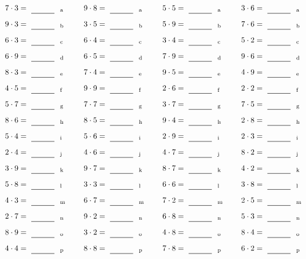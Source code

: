 \documentclass
[
  draft    = true,
  fontsize = 11pt,
  parskip  = half-
]
{scrartcl}
\begin{document}
\par\vfill\par
\begin{align*}
    \pline{7\cdot3}&=\rline{a}
  & \pline{9\cdot8}&=\rline{a}
  & \pline{5\cdot5}&=\rline{a}
  & \pline{3\cdot6}&=\rline{a} \\[1ex]
    \pline{9\cdot3}&=\rline{b}
  & \pline{3\cdot5}&=\rline{b}
  & \pline{5\cdot9}&=\rline{b}
  & \pline{7\cdot6}&=\rline{b} \\[1ex]
    \pline{6\cdot3}&=\rline{c}
  & \pline{6\cdot4}&=\rline{c}
  & \pline{3\cdot4}&=\rline{c}
  & \pline{5\cdot2}&=\rline{c} \\[1ex]
    \pline{6\cdot9}&=\rline{d}
  & \pline{6\cdot5}&=\rline{d}
  & \pline{7\cdot9}&=\rline{d}
  & \pline{9\cdot6}&=\rline{d} \\[1ex]
    \pline{8\cdot3}&=\rline{e}
  & \pline{7\cdot4}&=\rline{e}
  & \pline{9\cdot5}&=\rline{e}
  & \pline{4\cdot9}&=\rline{e} \\[1ex]
    \pline{4\cdot5}&=\rline{f}
  & \pline{9\cdot9}&=\rline{f}
  & \pline{2\cdot6}&=\rline{f}
  & \pline{2\cdot2}&=\rline{f} \\[1ex]
    \pline{5\cdot7}&=\rline{g}
  & \pline{7\cdot7}&=\rline{g}
  & \pline{3\cdot7}&=\rline{g}
  & \pline{7\cdot5}&=\rline{g} \\[1ex]
    \pline{8\cdot6}&=\rline{h}
  & \pline{8\cdot5}&=\rline{h}
  & \pline{9\cdot4}&=\rline{h}
  & \pline{2\cdot8}&=\rline{h} \\[1ex]
    \pline{5\cdot4}&=\rline{i}
  & \pline{5\cdot6}&=\rline{i}
  & \pline{2\cdot9}&=\rline{i}
  & \pline{2\cdot3}&=\rline{i} \\[1ex]
    \pline{2\cdot4}&=\rline{j}
  & \pline{4\cdot6}&=\rline{j}
  & \pline{4\cdot7}&=\rline{j}
  & \pline{8\cdot2}&=\rline{j} \\[1ex]
    \pline{3\cdot9}&=\rline{k}
  & \pline{9\cdot7}&=\rline{k}
  & \pline{8\cdot7}&=\rline{k}
  & \pline{4\cdot2}&=\rline{k} \\[1ex]
    \pline{5\cdot8}&=\rline{l}
  & \pline{3\cdot3}&=\rline{l}
  & \pline{6\cdot6}&=\rline{l}
  & \pline{3\cdot8}&=\rline{l} \\[1ex]
    \pline{4\cdot3}&=\rline{m}
  & \pline{6\cdot7}&=\rline{m}
  & \pline{7\cdot2}&=\rline{m}
  & \pline{2\cdot5}&=\rline{m} \\[1ex]
    \pline{2\cdot7}&=\rline{n}
  & \pline{9\cdot2}&=\rline{n}
  & \pline{6\cdot8}&=\rline{n}
  & \pline{5\cdot3}&=\rline{n} \\[1ex]
    \pline{8\cdot9}&=\rline{o}
  & \pline{3\cdot2}&=\rline{o}
  & \pline{4\cdot8}&=\rline{o}
  & \pline{8\cdot4}&=\rline{o} \\[1ex]
    \pline{4\cdot4}&=\rline{p}
  & \pline{8\cdot8}&=\rline{p}
  & \pline{7\cdot8}&=\rline{p}
  & \pline{6\cdot2}&=\rline{p}
\end{align*}
\end{document}
